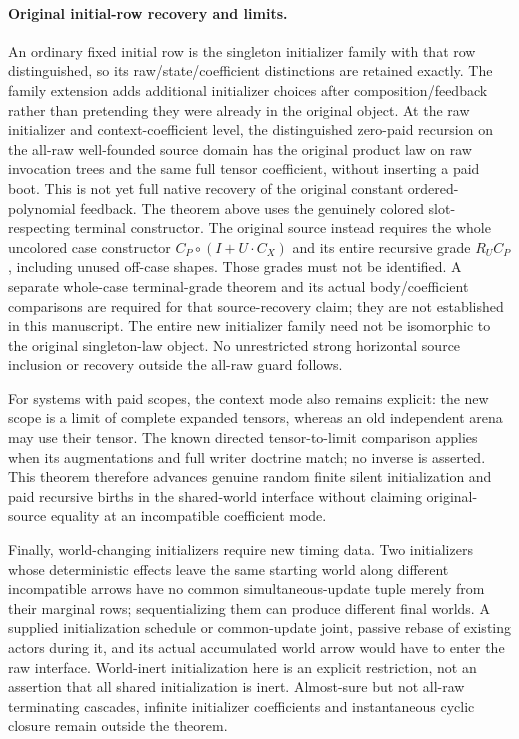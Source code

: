 \documentclass[11pt]{article}
\begin{document}
\paragraph{Original initial-row recovery and limits.}
An ordinary fixed initial row is the singleton initializer family with that row distinguished, so its raw/state/coefficient distinctions are retained exactly. The family extension adds additional initializer choices after composition/feedback rather than pretending they were already in the original object. At the raw initializer and context-coefficient level, the distinguished zero-paid recursion on the all-raw well-founded source domain has the original product law on raw invocation trees and the same full tensor coefficient, without inserting a paid boot. This is not yet full native recovery of the original constant ordered-polynomial feedback. The theorem above uses the genuinely colored slot-respecting terminal constructor. The original source instead requires the whole uncolored case constructor $C_P\circ(I+U\cdot C_X)$ and its entire recursive grade $R_UC_P$, including unused off-case shapes. Those grades must not be identified. A separate whole-case terminal-grade theorem and its actual body/coefficient comparisons are required for that source-recovery claim; they are not established in this manuscript. The entire new initializer family need not be isomorphic to the original singleton-law object. No unrestricted strong horizontal source inclusion or recovery outside the all-raw guard follows.

For systems with paid scopes, the context mode also remains explicit: the new scope is a limit of complete expanded tensors, whereas an old independent arena may use their tensor. The known directed tensor-to-limit comparison applies when its augmentations and full writer doctrine match; no inverse is asserted. This theorem therefore advances genuine random finite silent initialization and paid recursive births in the shared-world interface without claiming original-source equality at an incompatible coefficient mode.

Finally, world-changing initializers require new timing data. Two initializers whose deterministic effects leave the same starting world along different incompatible arrows have no common simultaneous-update tuple merely from their marginal rows; sequentializing them can produce different final worlds. A supplied initialization schedule or common-update joint, passive rebase of existing actors during it, and its actual accumulated world arrow would have to enter the raw interface. World-inert initialization here is an explicit restriction, not an assertion that all shared initialization is inert. Almost-sure but not all-raw terminating cascades, infinite initializer coefficients and instantaneous cyclic closure remain outside the theorem.
\end{document}
